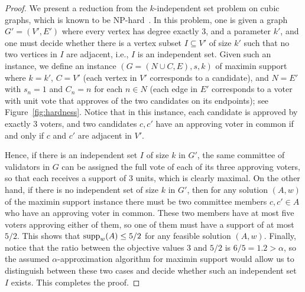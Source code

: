 \begin{proof}
We present a reduction from the $k$-independent set problem on cubic graphs, which is known to be NP-hard~\cite{johnson1979computers}. In this problem, one is given a graph $G'=(V',E')$ where every vertex has degree exactly 3, and a parameter $k'$, and one must decide whether there is a vertex subset $I\subseteq V'$ of size $k'$ such that no two vertices in $I$ are adjacent, i.e., $I$ is an independent set. 
Given such an instance, we define an instance $(G=(N\cup C, E), s, k)$ of maximin support where $k=k'$, $C=V'$ (each vertex in $V'$ corresponds to a candidate), and $N=E'$ with $s_n=1$ and $C_n=n$ for each $n\in N$ (each edge in $E'$ corresponds to a voter with unit vote that approves of the two candidates on its endpoints); see Figure~\ref{fig:hardness}.
Notice that in this instance, each candidate is approved by exactly 3 voters, and two candidates $c, c'$ have an approving voter in common if and only if $c$ and $c'$ are adjacent in $V'$.

Hence, if there is an independent set $I$ of size $k$ in $G'$, the same committee of validators in $G$ can be assigned the full vote of each of its three approving voters, so that each receives a support of 3 units, which is clearly maximal. On the other hand, if there is no independent set of size $k$ in $G'$, then for any solution $(A,w)$ of the maximin support instance there must be two committee members $c,c'\in A$ who have an approving voter in common. These two members have at most five voters approving either of them, so one of them must have a support of at most $5/2$. This shows that $\operatorname{supp}_w(A)\leq 5/2$ for any feasible solution $(A,w)$. Finally, notice that the ratio between the objective values $3$ and $5/2$ is $6/5=1.2>\alpha$, so the assumed $\alpha$-approximation algorithm for maximin support would allow us to distinguish between these two cases and decide whether such an independent set $I$ exists. This completes the proof.
\end{proof}


